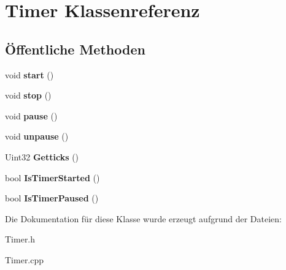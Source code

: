 \hypertarget{class_timer}{\section{Timer Klassenreferenz}
\label{class_timer}
}
\subsection*{Öffentliche Methoden}
\begin{DoxyCompactItemize}
\item 
\hypertarget{class_timer_a3a8b5272198d029779dc9302a54305a8}{void {\bfseries start} ()}\label{class_timer_a3a8b5272198d029779dc9302a54305a8}

\item 
\hypertarget{class_timer_a63f0eb44b27402196590a03781515dba}{void {\bfseries stop} ()}\label{class_timer_a63f0eb44b27402196590a03781515dba}

\item 
\hypertarget{class_timer_a0289effad7b573c508bc27e405900a23}{void {\bfseries pause} ()}\label{class_timer_a0289effad7b573c508bc27e405900a23}

\item 
\hypertarget{class_timer_aa4dd50d7ed48ac73efed2950749d35d6}{void {\bfseries unpause} ()}\label{class_timer_aa4dd50d7ed48ac73efed2950749d35d6}

\item 
\hypertarget{class_timer_a419af9cdb3d77331954a78a9c877de11}{Uint32 {\bfseries Getticks} ()}\label{class_timer_a419af9cdb3d77331954a78a9c877de11}

\item 
\hypertarget{class_timer_a6bbccc880351d19cedc6686b8a502127}{bool {\bfseries Is\-Timer\-Started} ()}\label{class_timer_a6bbccc880351d19cedc6686b8a502127}

\item 
\hypertarget{class_timer_addc24cd782c4d73db0a929894960ccf2}{bool {\bfseries Is\-Timer\-Paused} ()}\label{class_timer_addc24cd782c4d73db0a929894960ccf2}

\end{DoxyCompactItemize}


Die Dokumentation für diese Klasse wurde erzeugt aufgrund der Dateien\-:\begin{DoxyCompactItemize}
\item 
Timer.\-h\item 
Timer.\-cpp\end{DoxyCompactItemize}
